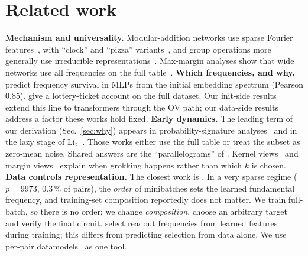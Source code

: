 \documentclass[10pt]{article}
\begin{document}
\section{Related work}
\label{sec:related}
\textbf{Mechanism and universality.} Modular-addition networks use sparse Fourier
features~\citep{nanda2023progress,gromov2023grokking}, with ``clock'' and ``pizza'' variants~\citep{zhong2023clock}, and
group operations more generally use irreducible representations~\citep{chughtai2023toy}. Max-margin analyses show that
wide networks use all frequencies on the full table~\citep{morwani2024feature}.
\textbf{Which frequencies, and why.} \citet{ding2024survival} predict frequency survival in MLPs from the initial
embedding spectrum (Pearson 0.85). \citet{he2026mechanism} give a lottery-ticket account on the full dataset. Our init-side
results extend this line to transformers through the OV path; our data-side results address a factor these works hold
fixed.
\textbf{Early dynamics.} The leading term of our derivation (Sec.~\ref{sec:why}) appears in probability-signature
analyses~\citep{yao2025probability,wang2026probability} and in the lazy stage of Li$_2$~\citep{tian2025provable}. Those
works either use the full table or treat the subset as zero-mean noise. Shared answers are the ``parallelograms'' of
\citet{liu2022effective}. Kernel views~\citep{kumar2024grokking,rubin2024grokking,mallinar2025emergence,tomas2026breaking}
and margin views~\citep{mohamadi2024why} explain when grokking happens rather than which $k$ is chosen.
\textbf{Data controls representation.} The closest work is \citet{ledoux2026order}. In a very sparse regime ($p=9973$,
0.3\,\% of pairs), the \emph{order} of minibatches sets the learned fundamental frequency, and training-set composition
reportedly does not matter. We train full-batch, so there is no order; we change \emph{composition}, choose an arbitrary
target and verify the final circuit. \citet{kumar2026flat} select readout frequencies from learned features during
training; this differs from predicting selection from data alone. We use per-pair datamodels~\citep{ilyas2022datamodels}
as one tool.
\end{document}
